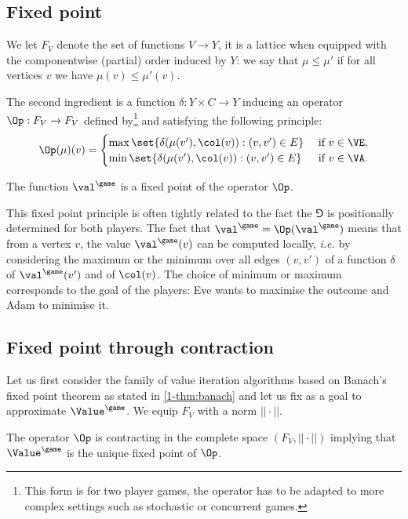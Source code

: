 \subsection*{Fixed point}
We let $F_V$ denote the set of functions $V \to Y$, it is a lattice when equipped with the componentwise (partial) order induced by $Y$:
we say that $\mu \le \mu'$ if for all vertices $v$ we have $\mu(v) \le \mu'(v)$.

The second ingredient is a function $\delta : Y \times C \to Y$ inducing an operator $\Op : F_V \to F_V$ defined by\footnote{This form is for two player games, the operator has to be adapted to more complex settings such as stochastic or concurrent games.} and satisfying the following principle:
\[
\Op(\mu)(v) = 
\begin{cases}
\max \set{\delta( \mu(v'), \col(v)) : (v,v') \in E} & \text{ if } v \in \VE, \\
\min \set{\delta( \mu(v'), \col(v)) : (v,v') \in E} & \text{ if } v \in \VA.
\end{cases}
\]

\begin{principle}
The function $\val^{\game}$ is a fixed point of the operator $\Op$.
\end{principle}
This fixed point principle is often tightly related to the fact the $\Game$ is positionally determined for both players.
The fact that $\val^{\game} = \Op(\val^{\game})$ means that from a vertex $v$, 
the value $\val^{\game}(v)$ can be computed locally, \textit{i.e.} by considering the maximum or the minimum over all edges $(v,v')$ 
of a function $\delta$ of $\val^{\game}(v')$ and of $\col(v)$.
The choice of minimum or maximum corresponds to the goal of the players: Eve wants to maximise the outcome and Adam to minimise it.

\subsection*{Fixed point through contraction}
Let us first consider the family of value iteration algorithms based on Banach's fixed point theorem as stated in \cref{1-thm:banach}
and let us fix as a goal to approximate $\Value^{\game}$.
We equip $F_V$ with a norm $||\cdot||$.

\begin{principle}
The operator $\Op$ is contracting in the complete space $(F_V,||\cdot||)$ implying that $\Value^{\game}$ is the unique fixed point of $\Op$.
\end{principle}

